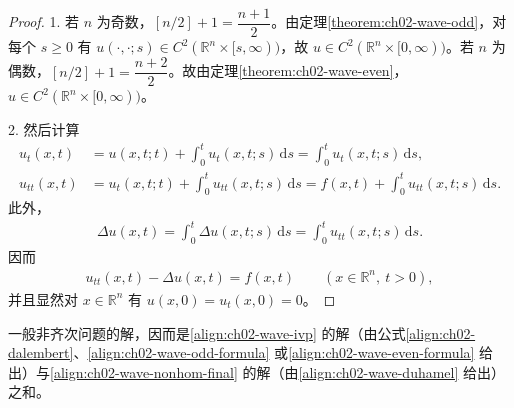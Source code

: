 \documentclass[../../main.tex]{subfiles}
\begin{document}
\begin{proof}
1. 若 $n$ 为奇数，$[n/2]+1=\dfrac{n+1}{2}$。由定理\cref{theorem:ch02-wave-odd}，对每个 $s\geqslant 0$ 有 $u(\cdot,\cdot;s)\in C^2(\mathbb{R}^n\times[s,\infty))$，故 $u\in C^2(\mathbb{R}^n\times[0,\infty))$。若 $n$ 为偶数，$[n/2]+1=\dfrac{n+2}{2}$。故由定理\cref{theorem:ch02-wave-even}，$u\in C^2(\mathbb{R}^n\times[0,\infty))$。

2. 然后计算
\begin{align*}
u_t(x,t)&=u(x,t;t)+\int_0^t u_t(x,t;s)\,\mathrm{d}s=\int_0^t u_t(x,t;s)\,\mathrm{d}s,\\
u_{tt}(x,t)&=u_t(x,t;t)+\int_0^t u_{tt}(x,t;s)\,\mathrm{d}s=f(x,t)+\int_0^t u_{tt}(x,t;s)\,\mathrm{d}s.
\end{align*}
此外，
\begin{align*}
\Delta u(x,t)=\int_0^t\Delta u(x,t;s)\,\mathrm{d}s=\int_0^t u_{tt}(x,t;s)\,\mathrm{d}s.
\end{align*}
因而
\begin{align*}
u_{tt}(x,t)-\Delta u(x,t)=f(x,t) \qquad (x\in\mathbb{R}^n,\ t>0),
\end{align*}
并且显然对 $x\in\mathbb{R}^n$ 有 $u(x,0)=u_t(x,0)=0$。
\end{proof}

一般非齐次问题的解，因而是\eqref{align:ch02-wave-ivp} 的解（由公式\eqref{align:ch02-dalembert}、\eqref{align:ch02-wave-odd-formula} 或\eqref{align:ch02-wave-even-formula} 给出）与\eqref{align:ch02-wave-nonhom-final} 的解（由\eqref{align:ch02-wave-duhamel} 给出）之和。
\end{document}
